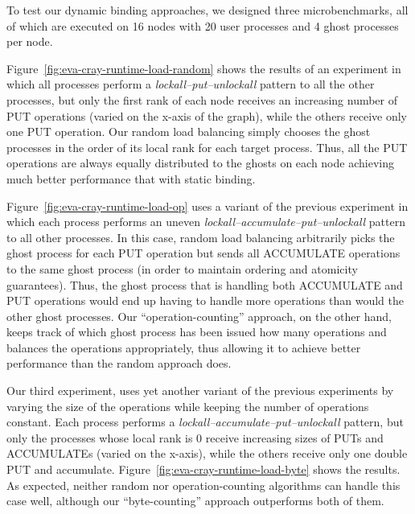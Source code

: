 To test our dynamic binding
approaches, we designed three microbenchmarks, all of which are
executed on 16 nodes with 20 user processes and 4 ghost processes per
node.

Figure~\ref{fig:eva-cray-runtime-load-random} shows the results of an experiment
in which all processes perform a \emph{lockall--put--unlockall} pattern
to all the other processes, but only the first rank of each node
receives an increasing number of PUT operations (varied on the x-axis
of the graph), while the others receive only one PUT operation.  Our
random load balancing simply chooses the ghost processes in the order
of its local rank for each target process.  Thus, all the PUT
operations are always equally distributed to the ghosts on each node
achieving much better performance that with static binding.

Figure~\ref{fig:eva-cray-runtime-load-op} uses a variant of the
previous experiment in which each process performs an uneven
\emph{lockall--accumulate--put--unlockall} pattern to all other
processes. In this case, random load balancing arbitrarily picks the
ghost process for each PUT operation but sends all ACCUMULATE
operations to the same ghost process (in order to maintain ordering
and atomicity guarantees).  Thus, the ghost process that is handling
both ACCUMULATE and PUT operations would end up having to handle more
operations than would the other ghost processes.  Our
``operation-counting'' approach, on the other hand, keeps track of
which ghost process has been issued how many operations and balances
the operations appropriately, thus allowing it to achieve better
performance than the random approach does.

Our third experiment,
uses yet another variant of the previous experiments by varying the
size of the operations while keeping the number of operations
constant.  Each process performs a
\emph{lockall--accumulate--put--unlockall} pattern, but only the
processes whose local rank is 0 receive increasing sizes of PUTs and
ACCUMULATEs (varied on the x-axis), while the others receive only one
double PUT and accumulate.
Figure~\ref{fig:eva-cray-runtime-load-byte} shows the results.
As expected, neither random nor
operation-counting algorithms can handle this case well, although
our ``byte-counting'' approach outperforms both of them.


